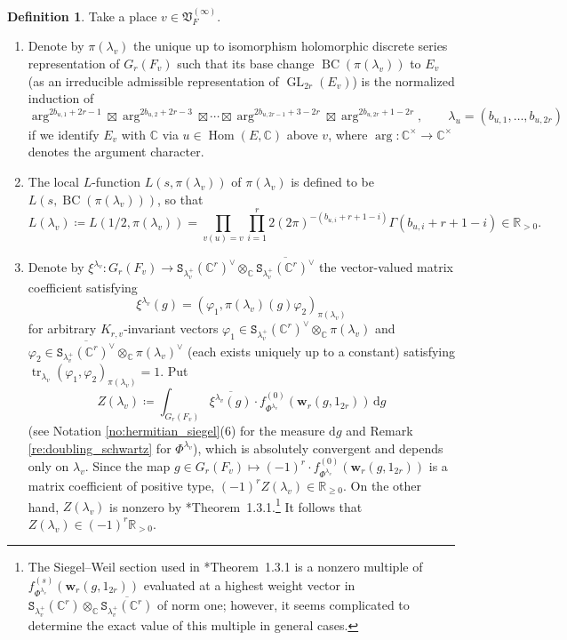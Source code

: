 \documentclass[12pt]{amsart}
\numberwithin{equation}{section}
\theoremstyle{plain}
\theoremstyle{definition}
\newtheorem{definition}[proposition]{Definition}
\theoremstyle{remark}
\renewcommand{\b}[1]{\mathbf{#1}}
\renewcommand{\d}[1]{\mathbb{#1}}
\newcommand{\f}[1]{\mathfrak{#1}}
\renewcommand{\r}[1]{\mathrm{#1}}
\renewcommand{\(}{\left(}
\renewcommand{\)}{\right)}
\newcommand{\ol}[1]{\overline{#1}{}}
\renewcommand{\geq}{\geqslant}
\newcommand{\bw}{\b w}
\newcommand{\dC}{\d C}
\newcommand{\dR}{\d R}
\newcommand{\fV}{\f V}
\newcommand{\rd}{\,\r d}
\newcommand{\tS}{\mathtt{S}}
\DeclareMathOperator{\BC}{BC}
\DeclareMathOperator{\GL}{GL}
\DeclareMathOperator{\Hom}{Hom}
\DeclareMathOperator{\tr}{tr}
\begin{document}
\begin{definition}\label{de:archimedean_factor}
Take a place $v\in\fV_F^{(\infty)}$.
\begin{enumerate}
  \item Denote by $\pi(\lambda_v)$ the unique up to isomorphism holomorphic discrete series representation of $G_r(F_v)$ such that its base change $\BC(\pi(\lambda_v))$ to $E_v$ (as an irreducible admissible representation of $\GL_{2r}(E_v)$) is the normalized induction of
      \[
      \arg^{2b_{u,1}+2r-1}\boxtimes\arg^{2b_{u,2}+2r-3}\boxtimes\cdots\boxtimes\arg^{2b_{u,2r-1}+3-2r}
      \boxtimes\arg^{2b_{u,2r}+1-2r},
      \qquad \lambda_u=(b_{u,1},\dots,b_{u,2r})
      \]
      if we identify $E_v$ with $\dC$ via $u\in\Hom(E,\dC)$ above $v$, where $\arg\colon\dC^\times\to\dC^\times$ denotes the argument character.

  \item The local $L$-function $L(s,\pi(\lambda_v))$ of $\pi(\lambda_v)$ is defined to be $L(s,\BC(\pi(\lambda_v)))$, so that
      \[
      L(\lambda_v)\coloneqq L(1/2,\pi(\lambda_v))=\prod_{v(u)=v}\prod_{i=1}^r 2(2\pi)^{-(b_{u,i}+r+1-i)}\Gamma(b_{u,i}+r+1-i)\in\dR_{>0}.
      \]

  \item Denote by $\xi^{\lambda_v}\colon G_r(F_v)\to\tS_{\lambda_v^+}(\dC^r)^\vee\otimes_\dC\ol{\tS_{\lambda_v^+}(\dC^r)^\vee}$ the vector-valued matrix coefficient satisfying
      \[
      \xi^{\lambda_v}(g)=(\varphi_1,\pi(\lambda_v)(g)\varphi_2)_{\pi(\lambda_v)}
      \]
      for arbitrary $K_{r,v}$-invariant vectors $\varphi_1\in\tS_{\lambda_v^+}(\dC^r)^\vee\otimes_\dC\pi(\lambda_v)$ and $\varphi_2\in\ol{\tS_{\lambda_v^+}(\dC^r)^\vee}\otimes_\dC\pi(\lambda_v)^\vee$ (each exists uniquely up to a constant) satisfying $\tr_{\lambda_v}(\varphi_1,\varphi_2)_{\pi(\lambda_v)}=1$. Put
      \[
      Z(\lambda_v)\coloneqq\int_{G_r(F_v)}\ol{\xi^{\lambda_v}(g)}\cdot f_{\Phi^{\lambda_v}}^{(0)}(\bw_r(g,1_{2r}))\rd g
      \]
      (see Notation \ref{no:hermitian_siegel}(6) for the measure $\r{d}g$ and Remark \ref{re:doubling_schwartz} for $\Phi^{\lambda_v}$), which is absolutely convergent and depends only on $\lambda_v$. Since the map $g\in G_r(F_v)\mapsto (-1)^r\cdot f_{\Phi^{\lambda_v}}^{(0)}(\bw_r(g,1_{2r}))$ is a matrix coefficient of positive type, $(-1)^rZ(\lambda_v)\in\dR_{\geq 0}$. On the other hand, $Z(\lambda_v)$ is nonzero by \cite{EL24}*{Theorem~1.3.1}.\footnote{The Siegel--Weil section used in \cite{EL24}*{Theorem~1.3.1} is a nonzero multiple of $f_{\Phi^{\lambda_v}}^{(s)}(\bw_r(g,1_{2r}))$ evaluated at a highest weight vector in $\tS_{\lambda_v^+}(\dC^r)\otimes_\dC\ol{\tS_{\lambda_v^+}(\dC^r)}$ of norm one; however, it seems complicated to determine the exact value of this multiple in general cases.} It follows that $Z(\lambda_v)\in(-1)^r\dR_{>0}$.
\end{enumerate}
\end{definition}
\end{document}

